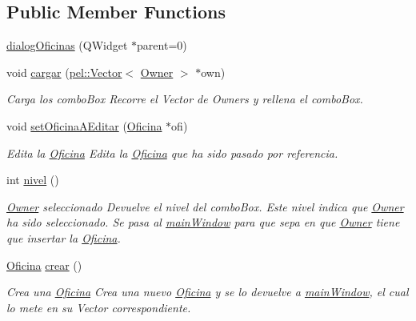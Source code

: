 \subsection*{Public Member Functions}
\begin{DoxyCompactItemize}
\item 
\hyperlink{classdialogOficinas_a38eadc87eb5381d6447af6b54d73bf53}{dialog\+Oficinas} (Q\+Widget $\ast$parent=0)
\item 
\hypertarget{classdialogOficinas_a0c288a8d061c6166813655108f58201f}{}void \hyperlink{classdialogOficinas_a0c288a8d061c6166813655108f58201f}{cargar} (\hyperlink{classpel_1_1Vector}{pel\+::\+Vector}$<$ \hyperlink{classOwner}{Owner} $>$ $\ast$own)\label{classdialogOficinas_a0c288a8d061c6166813655108f58201f}

\begin{DoxyCompactList}\small\item\em Carga los combo\+Box Recorre el Vector de Owners y rellena el combo\+Box. \end{DoxyCompactList}\item 
\hypertarget{classdialogOficinas_acc1a0e8268c26201cb9370cd5d6fcbf7}{}void \hyperlink{classdialogOficinas_acc1a0e8268c26201cb9370cd5d6fcbf7}{set\+Oficina\+A\+Editar} (\hyperlink{classOficina}{Oficina} $\ast$ofi)\label{classdialogOficinas_acc1a0e8268c26201cb9370cd5d6fcbf7}

\begin{DoxyCompactList}\small\item\em Edita la \hyperlink{classOficina}{Oficina} Edita la \hyperlink{classOficina}{Oficina} que ha sido pasado por referencia. \end{DoxyCompactList}\item 
\hypertarget{classdialogOficinas_a46996aad61f5441f20c94012a864d277}{}int \hyperlink{classdialogOficinas_a46996aad61f5441f20c94012a864d277}{nivel} ()\label{classdialogOficinas_a46996aad61f5441f20c94012a864d277}

\begin{DoxyCompactList}\small\item\em \hyperlink{classOwner}{Owner} seleccionado Devuelve el nivel del combo\+Box. Este nivel indica que \hyperlink{classOwner}{Owner} ha sido seleccionado. Se pasa al \hyperlink{classmainWindow}{main\+Window} para que sepa en que \hyperlink{classOwner}{Owner} tiene que insertar la \hyperlink{classOficina}{Oficina}. \end{DoxyCompactList}\item 
\hypertarget{classdialogOficinas_af32d29c6889afddbcd1a89543fccf666}{}\hyperlink{classOficina}{Oficina} \hyperlink{classdialogOficinas_af32d29c6889afddbcd1a89543fccf666}{crear} ()\label{classdialogOficinas_af32d29c6889afddbcd1a89543fccf666}

\begin{DoxyCompactList}\small\item\em Crea una \hyperlink{classOficina}{Oficina} Crea una nuevo \hyperlink{classOficina}{Oficina} y se lo devuelve a \hyperlink{classmainWindow}{main\+Window}, el cual lo mete en su Vector correspondiente. \end{DoxyCompactList}\end{DoxyCompactItemize}


